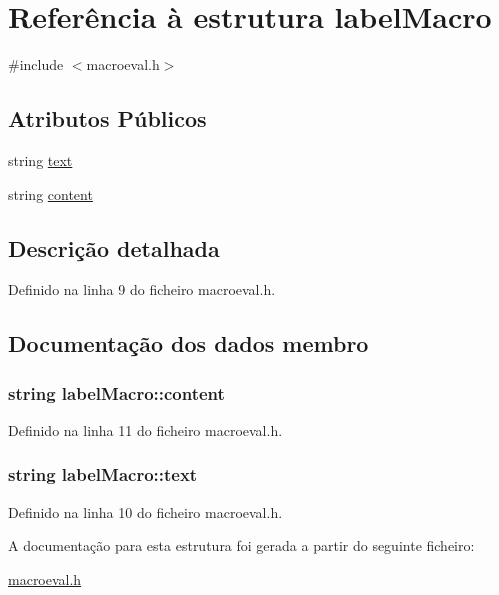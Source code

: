 \hypertarget{structlabel_macro}{\section{Referência à estrutura label\-Macro}
\label{structlabel_macro}
}


{\ttfamily \#include $<$macroeval.\-h$>$}

\subsection*{Atributos Públicos}
\begin{DoxyCompactItemize}
\item 
string \hyperlink{structlabel_macro_a0a409fc7315d98fd176c3b1a42ffca72}{text}
\item 
string \hyperlink{structlabel_macro_a004fcb945369576104c32889af74e190}{content}
\end{DoxyCompactItemize}


\subsection{Descrição detalhada}


Definido na linha 9 do ficheiro macroeval.\-h.



\subsection{Documentação dos dados membro}
\hypertarget{structlabel_macro_a004fcb945369576104c32889af74e190}{
\subsubsection[{content}]{\setlength{\rightskip}{0pt plus 5cm}string label\-Macro\-::content}}\label{structlabel_macro_a004fcb945369576104c32889af74e190}


Definido na linha 11 do ficheiro macroeval.\-h.

\hypertarget{structlabel_macro_a0a409fc7315d98fd176c3b1a42ffca72}{
\subsubsection[{text}]{\setlength{\rightskip}{0pt plus 5cm}string label\-Macro\-::text}}\label{structlabel_macro_a0a409fc7315d98fd176c3b1a42ffca72}


Definido na linha 10 do ficheiro macroeval.\-h.



A documentação para esta estrutura foi gerada a partir do seguinte ficheiro\-:\begin{DoxyCompactItemize}
\item 
\hyperlink{macroeval_8h}{macroeval.\-h}\end{DoxyCompactItemize}
